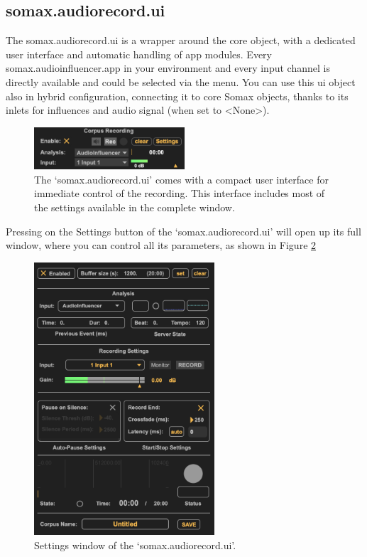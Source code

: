 \subsection{somax.audiorecord.ui}

The somax.audiorecord.ui is a wrapper around the core object, with a dedicated user interface and automatic handling of app modules. Every somax.audioinfluencer.app in your environment and every input channel is directly available and could be selected via the menu. You can use this ui object also in hybrid configuration, connecting it to core Somax objects, thanks to its inlets for influences and audio signal (when set to <None>).

\begin{figure}[H]
    \centering        
 	\includegraphics[width=0.5\textwidth]{img/audiorecord_compact.png}
    \caption{The `somax.audiorecord.ui' comes with a compact user interface for immediate control of the recording. This interface includes most of the settings available in the complete window.}
    \label{fig:audiorecord_ui}
\end{figure}

Pressing on the Settings button of the `somax.audiorecord.ui' will open up its full window, where you can control all its parameters, as shown in Figure \ref{fig:audiorecord_window}

\begin{figure}[H]
    \centering        
 	\includegraphics[width=0.6\textwidth]{img/audiorecord_window.png}
    \caption{Settings window of the `somax.audiorecord.ui'.}
    \label{fig:audiorecord_window}
\end{figure}

